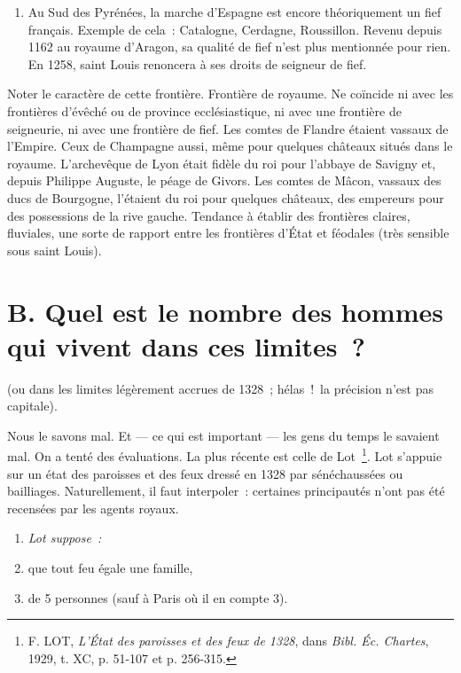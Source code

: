 \documentclass[french,twoside]{book} %
\newlength{\listmod}
\newcommand{\listhead}[1]{\hspace{-1\listmod}\emph{#1}}
\begin{document}
\begin{enumerate}[itemsep=0pt,]
\item Au Sud des Pyrénées, la marche d’Espagne est encore théoriquement un fief français. Exemple de cela : Catalogne, Cerdagne, Roussillon. Revenu depuis 1162 au royaume d’Aragon, sa qualité de fief n’est plus mentionnée pour rien. En 1258, saint Louis renoncera à ses droits de seigneur de fief.
\end{enumerate}

\noindent Noter le caractère de cette frontière. Frontière de royaume. Ne coïncide ni avec les frontières d’évêché ou de province ecclésiastique, ni avec une frontière de seigneurie, ni avec une frontière de fief. Les comtes de Flandre étaient vassaux de l’Empire. Ceux de Champagne aussi, même pour quelques châteaux situés dans le royaume. L’archevêque de Lyon était fidèle du roi pour l’abbaye de Savigny et, depuis Philippe Auguste, le péage de Givors. Les comtes de Mâcon, vassaux des ducs de Bourgogne, l’étaient du roi pour quelques châteaux, des empereurs pour des possessions de la rive gauche. Tendance à établir des frontières claires, fluviales, une sorte de rapport entre les frontières d’État et féodales (très sensible sous saint Louis).
\section[{B. Quel est le nombre des hommes qui vivent dans ces limites ?}]{B. Quel est le nombre des hommes qui vivent dans ces limites ?}
\label{c02b}
\noindent (ou dans les limites légèrement accrues de 1328 ; hélas ! la précision n’est pas capitale).\par
Nous le savons mal. Et — ce qui est important — les gens du temps le savaient mal. On a tenté des évaluations. La plus récente est celle de Lot \footnote{F. LOT, {\itshape L’État des paroisses et des feux de 1328}, dans {\itshape Bibl. Éc. Chartes}, 1929, t. XC, p. 51-107 et p. 256-315.}. Lot s’appuie sur un état des paroisses et des feux dressé en 1328 par sénéchaussées ou bailliages. Naturellement, il faut interpoler : certaines principautés n’ont pas été recensées par les agents royaux.\par

\begin{enumerate}[itemsep=0pt,]
\item[]\listhead{Lot suppose :}
\item que tout feu égale une famille,
\item de 5 personnes (sauf à Paris où il en compte 3).
\end{enumerate}
\end{document}
